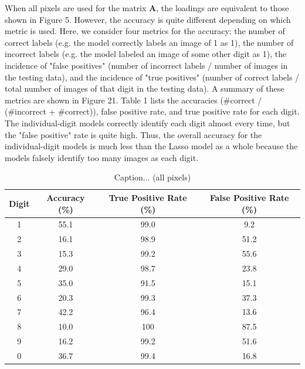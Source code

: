 \documentclass[10pt]{article}
\begin{document}
When all pixels are used for the matrix $\textbf{A}$, the loadings are equivalent to those shown in Figure 5. However, the accuracy is quite different depending on which metric is used. Here, we consider four metrics for the accuracy: the number of correct labels (e.g. the model correctly labels an image of 1 as 1), the number of incorrect labels (e.g. the model labeled an image of some other digit as 1), the incidence of "false positives" (number of incorrect labels / number of images in the testing data), and the incidence of "true positives" (number of correct labels / total number of images of that digit in the testing data). A summary of these metrics are shown in Figure 21. Table 1 lists the accuracies (\#correct / (\#incorrect + \#correct)), false positive rate, and true positive rate for each digit. The individual-digit models correctly identify each digit almost every time, but the "false positive" rate is quite high. Thus, the overall accuracy for the individual-digit models is much less than the Lasso model as a whole because the models falsely identify too many images as each digit. %

\begin{table}[ht]
\caption{Caption... (all pixels)}
\label{table1}
\begin{tabular}{|c|c|c|c|}
\hline
Digit & Accuracy (\%) & True Positive Rate (\%) & False Positive Rate (\%) \\ \hline
1     & 55.1          & 99.0                    & 9.2                      \\ \hline
2     & 16.1          & 98.9                    & 51.2                     \\ \hline
3     & 15.3          & 99.2                    & 55.6                     \\ \hline
4     & 29.0          & 98.7                    & 23.8                     \\ \hline
5     & 35.0          & 91.5                    & 15.1                     \\ \hline
6     & 20.3          & 99.3                    & 37.3                     \\ \hline
7     & 42.2          & 96.4                    & 13.6                     \\ \hline
8     & 10.0          & 100                     & 87.5                     \\ \hline
9     & 16.2          & 99.2                    & 51.6                     \\ \hline
0     & 36.7          & 99.4                    & 16.8                     \\ \hline
\end{tabular}
\end{table}
\end{document}
